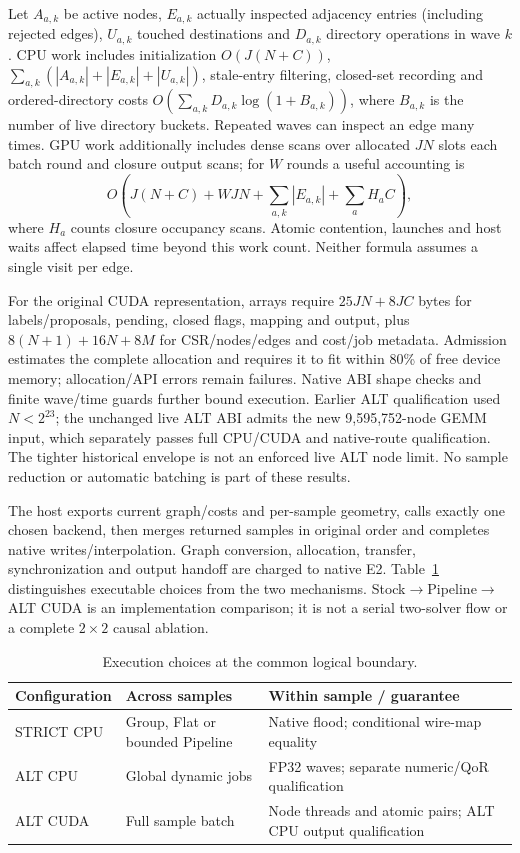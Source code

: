 Let $A_{a,k}$ be active nodes, $E_{a,k}$ actually inspected adjacency entries (including rejected edges), $U_{a,k}$ touched destinations and $D_{a,k}$ directory operations in wave $k$. CPU work includes initialization $O(J(N+C))$, $\sum_{a,k}(|A_{a,k}|+|E_{a,k}|+|U_{a,k}|)$, stale-entry filtering, closed-set recording and ordered-directory costs $O(\sum_{a,k}D_{a,k}\log(1+B_{a,k}))$, where $B_{a,k}$ is the number of live directory buckets. Repeated waves can inspect an edge many times. GPU work additionally includes dense scans over allocated $JN$ slots each batch round and closure output scans; for $W$ rounds a useful accounting is
\begin{equation}
 O\!\left(J(N+C)+WJN+\sum_{a,k}|E_{a,k}|+\sum_a H_a C\right),
\end{equation}
where $H_a$ counts closure occupancy scans. Atomic contention, launches and host waits affect elapsed time beyond this work count. Neither formula assumes a single visit per edge.

For the original CUDA representation, arrays require $25JN+8JC$ bytes for labels/proposals, pending, closed flags, mapping and output, plus $8(N+1)+16N+8M$ for CSR/nodes/edges and cost/job metadata. Admission estimates the complete allocation and requires it to fit within 80\% of free device memory; allocation/API errors remain failures. Native ABI shape checks and finite wave/time guards further bound execution. Earlier ALT qualification used $N<2^{23}$; the unchanged live ALT ABI admits the new 9,595,752-node GEMM input, which separately passes full CPU/CUDA and native-route qualification. The tighter historical envelope is not an enforced live ALT node limit. No sample reduction or automatic batching is part of these results.

The host exports current graph/costs and per-sample geometry, calls exactly one chosen backend, then merges returned samples in original order and completes native writes/interpolation. Graph conversion, allocation, transfer, synchronization and output handoff are charged to native E2. Table~\ref{tab:configs} distinguishes executable choices from the two mechanisms. Stock$\to$Pipeline$\to$ALT CUDA is an implementation comparison; it is not a serial two-solver flow or a complete $2\times2$ causal ablation.

\begin{table}[t]\centering
\caption{Execution choices at the common logical boundary.}\label{tab:configs}
\begin{tabular}{lp{2.35cm}p{3.60cm}}\toprule
Configuration & Across samples & Within sample / guarantee\\\midrule
STRICT CPU & Group, Flat or bounded Pipeline & Native flood; conditional wire-map equality\\
ALT CPU & Global dynamic jobs & FP32 waves; separate numeric/QoR qualification\\
ALT CUDA & Full sample batch & Node threads and atomic pairs; ALT CPU output qualification\\\bottomrule
\end{tabular}\end{table}
